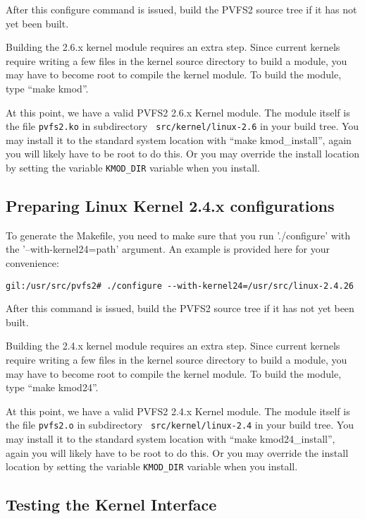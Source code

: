 \documentclass[11pt, letterpaper]{article}
\begin{document}
After this configure command is issued, build the PVFS2 source tree if it
has not yet been built.

Building the 2.6.x kernel module requires an extra step.  Since
current kernels require writing a few files in the kernel source
directory to build a module, you may have to become root to compile
the kernel module.  To build the module, type ``make kmod''.

At this point, we have a valid PVFS2 2.6.x Kernel module.  The module
itself is the file {\tt pvfs2.ko} in subdirectory {\tt
src/kernel/linux-2.6} in your build tree.  You may install it to the
standard system location with ``make kmod\_install'', again you will
likely have to be root to do this.  Or you may override the install
location by setting the variable {\tt KMOD\_DIR} variable when you
install.

\subsection{Preparing Linux Kernel 2.4.x configurations}
\label{sec:vfs24-configure}

To generate the Makefile, you need to make sure that you run
'./configure' with the '--with-kernel24=path' argument.  An example is
provided here for your convenience:

\begin{verbatim}
gil:/usr/src/pvfs2# ./configure --with-kernel24=/usr/src/linux-2.4.26
\end{verbatim}

After this command is issued, build the PVFS2 source tree if it has
not yet been built.

Building the 2.4.x kernel module requires an extra step.  Since
current kernels require writing a few files in the kernel source
directory to build a module, you may have to become root to compile
the kernel module.  To build the module, type ``make kmod24''.

At this point, we have a valid PVFS2 2.4.x Kernel module.  The module
itself is the file {\tt pvfs2.o} in subdirectory {\tt
src/kernel/linux-2.4} in your build tree.  You may install it to the
standard system location with ``make kmod24\_install'', again you will
likely have to be root to do this.  Or you may override the install
location by setting the variable {\tt KMOD\_DIR} variable when you
install.

\subsection{Testing the Kernel Interface}
\label{sec:vfs-test}
\end{document}
